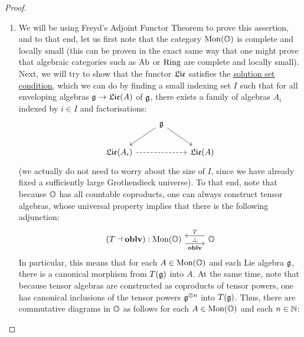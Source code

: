                     \begin{proof}
                        \noindent
                        \begin{enumerate}
                            \item We will be using Freyd's Adjoint Functor Theorem \cite[Theorem V.6.2]{maclane} to prove this assertion, and to that end, let us first note that the category $\mathrm{Mon}(\mathbb{O})$ is complete and locally small (this can be proven in the exact same way that one might prove that algebraic categories such as $\mathrm{Ab}$ or $\mathrm{Ring}$ are complete and locally small). Next, we will try to show that the functor $\mathfrak{Lie}$ satisfies the \href{https://ncatlab.org/nlab/show/solution+set+condition}{\underline{solution set condition}}, which we can do by finding a small indexing set $I$ such that for all enveloping algebras $\mathfrak{g} \to \mathfrak{Lie}(A)$ of $\mathfrak{g}$, there exists a family of algebras $A_i$ indexed by $i \in I$ and factorisations:
                                $$
                                    \begin{tikzcd}
                                    	& {\g} \\
                                    	{\frakLie(A_i)} && {\frakLie(A)}
                                    	\arrow[from=2-1, to=2-3, dashed]
                                    	\arrow["{}"', from=1-2, to=2-1]
                                    	\arrow["{}", from=1-2, to=2-3]
                                    \end{tikzcd}
                                $$
                            (we actually do not need to worry about the size of $I$, since we have already fixed a sufficiently large Grothendieck universe). To that end, note that because $\mathbb{O}$ has all countable coproducts, one can always construct tensor algebras, whose universal property implies that there is the following adjunction:
                                $$
                                    \begin{tikzcd}
                                    	{(T \ladjoint \oblv): \Mon(\O)} & {\O}
                                    	\arrow["{\oblv}"{name=0, swap}, from=1-1, to=1-2, shift right=2]
                                    	\arrow["{T}"{name=1, swap}, from=1-2, to=1-1, shift right=2]
                                    	\arrow["\dashv"{rotate=-90}, from=1, to=0, phantom]
                                    \end{tikzcd}
                                $$
                            In particular, this means that for each $A \in \mathrm{Mon}(\mathbb{O})$ and each Lie algebra $\mathfrak{g}$, there is a canonical morphism from $T(\mathfrak{g})$ into $A$. At the same time, note that because tensor algebras are constructed as coproducts of tensor powers, one has canonical inclusions of the tensor powers $\g^{\tensor n}$ into $T(\mathfrak{g})$. Thus, there are commutative diagrams in $\mathbb{O}$ as follows for each $A \in \mathrm{Mon}(\mathbb{O})$ and each $n \in \mathbb{N}$:

\end{enumerate}
\end{proof}

